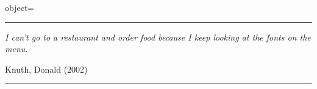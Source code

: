 \documentclass{article}
\newcommand{\myquote}{%
  \parbox{4cm}{
    \hrule\vspace{1ex}
    \textit{I can’t go to a restaurant and order food
      because I keep looking at the fonts on the menu.}

    \hfill Knuth, Donald (2002)%
    \vspace{1ex}
    \hrule
  }%
}
\begin{document}
\begin{pullquote}{object=\myquote}
  \lipsum[1]
\end{pullquote}
\end{document}
